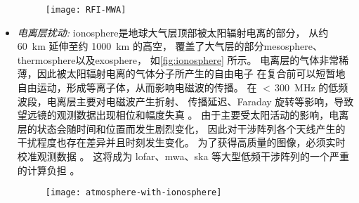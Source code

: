 \begin{itemize}
\begin{figure}[htp]
  \centering
  \texttt{[image: RFI-MWA]}
  \label{fig:rfi-mwa}
\end{figure}

\item
\emph{电离层扰动:}
\acf{ionosphere}是地球大气层顶部被太阳辐射电离的部分，
从约 \SI{60}{\km} 延伸至约 \SI{1000}{\km} 的高空，
覆盖了大气层的部分\ac{mesosphere}、\ac{thermosphere}以及\ac{exosphere}，
如\autoref{fig:ionosphere} 所示。
电离层的气体非常稀薄，因此被太阳辐射电离的气体分子所产生的自由电子
在复合前可以短暂地自由运动，形成等离子体，从而影响电磁波的传播。
在 $<$\,\SI{300}{\MHz} 的低频波段，电离层主要对电磁波产生折射、
传播延迟、Faraday 旋转等影响，导致望远镜的观测数据出现相位和幅度失真
\cite{intema2009,thompson2017}。
由于主要受太阳活动的影响，电离层的状态会随时间和位置而发生剧烈变化，
因此对干涉阵列各个天线产生的干扰程度也存在差异并且时刻发生变化。
为了获得高质量的图像，必须实时校准观测数据 \cite{intema2009,jordan2017}。
这将成为 \ac{lofar}、\ac{mwa}、\ac{ska} 等大型低频干涉阵列的一个严重的计算负担
\cite{intema2009,deGasperin2018}。

\begin{figure}[htp]
  \centering
  \texttt{[image: atmosphere-with-ionosphere]}
  \label{fig:ionosphere}
\end{figure}


\end{itemize}
